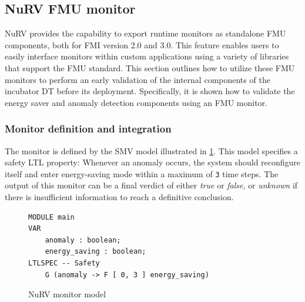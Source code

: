\subsection{NuRV FMU monitor}\label{subsec:NuRVmoni}
NuRV provides the capability to export runtime monitors as standalone FMU components, both for FMI version 2.0 and 3.0. This feature enables users to easily interface monitors within custom applications using a variety of libraries that support the FMU standard.
This section outlines how to utilize these FMU monitors to perform an
early validation of the internal components of the incubator DT before its deployment. Specifically, it is shown how to validate the energy saver and anomaly detection components using an FMU monitor.

\subsubsection{Monitor definition and integration}
The monitor is defined by the SMV model illustrated in \cref{fig:nurv_orbit_spec}. This model specifies a safety LTL property: Whenever an anomaly occurs, the system should reconfigure itself and enter energy-saving mode within a maximum of \texttt{3} time steps. The output of this monitor can be a final verdict of either \textit{true} or \textit{false}, or \textit{unknown} if there is insufficient information to reach a definitive conclusion.
%
\begin{figure}[ht]
	\centering
	\begin{lstlisting}
MODULE main
VAR
    anomaly : boolean;
    energy_saving : boolean;
LTLSPEC -- Safety
    G (anomaly -> F [ 0, 3 ] energy_saving)
	\end{lstlisting}
	\caption{NuRV monitor model}
	\label{fig:nurv_orbit_spec}
\end{figure}%
%
